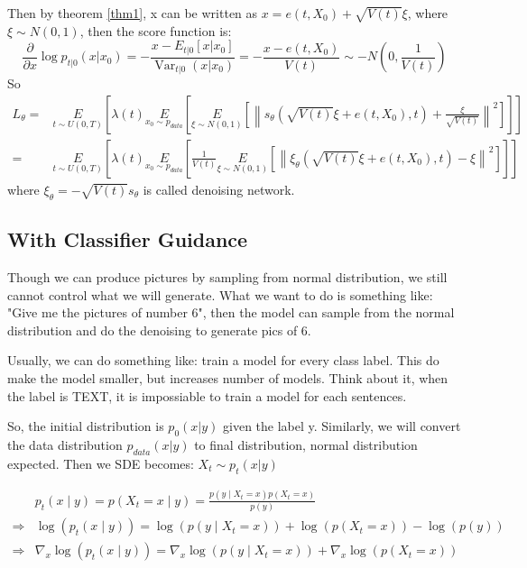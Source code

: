 \documentclass{article}
\begin{document}
Then by theorem \ref{thm1}, x can be written as $x=e(t, X_0)+\sqrt{V(t)}\xi$, where $\xi\sim N(0, 1)$, then the score function is:
\begin{equation}
    \frac{\partial}{\partial x} \log p_{t | 0}\left(x | x_{0}\right)=-\frac{x-E_{t | 0}\left[x | x_{0}\right]}{\operatorname{Var}_{t | 0}\left(x | x_{0}\right)}=-\frac{x-e(t, X_0)}{V(t)}\sim -N\left(0, \frac{1}{V(t)}\right)
\end{equation}
So
\begin{equation}
\begin{aligned}
    L_\theta=&\underset{t\sim U(0,T)}{E}\left[\lambda (t)\underset{x_0\sim p_{data}}{E}\left[\underset{\xi\sim N(0, 1)}{E}\left[\left\|s_\theta\left(\sqrt{V(t)}\xi+e(t, X_0), t\right) + \frac{\xi}{\sqrt{V(t)}}\right\|^2\right]\right]\right]\\
    =&\underset{t\sim U(0,T)}{E}\left[\lambda (t)\underset{x_0\sim p_{data}}{E}\left[\frac{1}{V(t)}\underset{\xi\sim N(0, 1)}{E}\left[\left\|\xi_\theta\left(\sqrt{V(t)}\xi+e(t, X_0), t\right)-\xi\right\|^2\right]\right]\right]
\end{aligned}    
\end{equation}
where $\xi_\theta = -\sqrt{V(t)}s_\theta$ is called denoising network.

\subsection{With Classifier Guidance}
Though we can produce pictures by sampling from normal distribution, we still cannot control what we will generate. What we want to do is something like:
"Give me the pictures of number 6", then the model can sample from the normal distribution and do the denoising to generate pics of 6. 

Usually, we can do something like: train a model for every class label. This do make the model smaller, but increases number of models. 
Think about it, when the label is TEXT, it is impossiable to train a model for each sentences. 

So, the initial distribution is $p_0(x|y)$ given the label y. Similarly, we will convert the data distribution $p_{data}(x|y)$ to final distribution, normal distribution expected.
Then we SDE becomes: $X_t \sim p_t(x|y)$


\begin{equation}
    \begin{aligned}
    & p_{t}(x \mid y)=p\left(X_{t}=x \mid y\right)=\frac{p\left(y \mid X_{t}=x\right) p\left(X_{t}=x\right)}{p(y)} \\
    \Rightarrow & \log \left(p_{t}(x \mid y)\right)=\log \left(p\left(y \mid X_{t}=x\right)\right)+\log \left(p\left(X_{t}=x\right)\right)-\log (p(y)) \\
    \Rightarrow & \nabla_{x} \log \left(p_{t}(x \mid y)\right)=\nabla_{x} \log \left(p\left(y \mid X_{t}=x\right)\right)+\nabla_{x} \log \left(p\left(X_{t}=x\right)\right)
    \end{aligned}
\end{equation}
    
\end{document}
